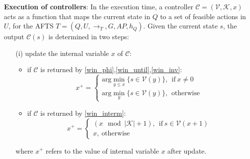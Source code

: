 
\begin{definition} \textbf{Execution of controllers}:
In the execution time, a controller $ \mathcal{C}=(\mathcal{V},\mathcal{K},x) $ acts as a function that maps the current state in $ Q $ to a set of feasible actions in $ U $, for the AFTS $ T = (Q,U,\rightarrow_T, G,AP,h_Q)$. Given the current state $ s $, the output $ \mathcal{C}(s) $ is determined in two steps:
\begin{itemize}
	\item[(i)] update the internal variable $ x $ of $ \mathcal{C} $: 
	\begin{itemize}
		\item 	if $ \mathcal{C} $ is returned by \eqref{win_phi},\eqref{win_until},\eqref{win_inv}:
		\begin{displaymath}
		x^+ =	\begin{cases}
		\text{arg}\min_{y\leq x}\{s\in \mathcal{V}(y)\},\ \ \text{if}\ x\not=0\\
		\text{arg}\min_{y}\{s\in \mathcal{V}(y)\},\ \ \text{otherwise}
		\end{cases}
		\end{displaymath}
		\item  if $ \mathcal{C} $ is returned by \eqref{win_interm}: %
		\begin{displaymath}
		x^+ = \begin{cases}
		(x\mod\vert\mathcal{K}\vert + 1),\ \ \text{if}\ s\in \mathcal{V}(x+1)\\
		x,\ \text{otherwise}
		\end{cases}
		\end{displaymath}
	\end{itemize}
	where $ x^+ $ refers to the value of internal variable $ x $ after update.


\end{itemize}
\end{definition}
